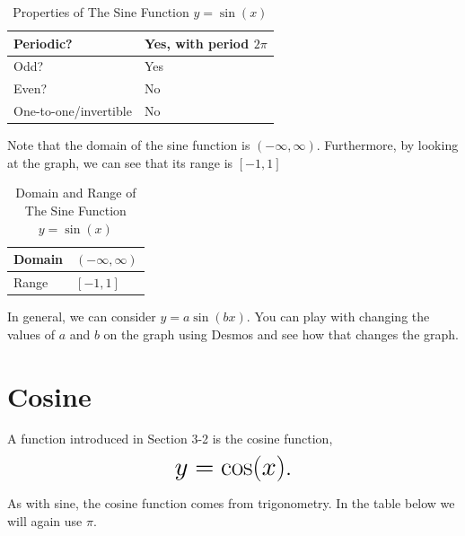 \documentclass[nooutcomes]{ximera}
\begin{document}
\begin{table}[h]
\caption{\label{tab:sineproperties}Properties of The Sine Function $y = \sin(x)$}
\centering
\begin{tabular}{l|l}
Periodic? & Yes, with period $2\pi$ \\ \hline
Odd? &  Yes \\ \hline
Even? & No \\ \hline
One-to-one/invertible & No
\end{tabular}
\end{table}

Note that the domain of the sine function is $(-\infty, \infty)$. Furthermore, by looking at the graph, we can see that its range is $[-1, 1]$

\begin{table}[h]
\caption{\label{tab:sinedr}Domain and Range of The Sine Function $y = \sin(x)$}
\centering
\begin{tabular}{l|l}
Domain & $(-\infty, \infty)$ \\ \hline
Range & $[-1, 1]$
\end{tabular}
\end{table}

In general, we can consider $y=a\sin(bx)$.  You can play with changing the values of $a$ and $b$ on the graph using Desmos and see how that changes the graph.  

\begin{center}  
\end{center}



\newpage


\section{Cosine}
A function introduced in Section 3-2 is the cosine function, $$ \mbox{\huge $y=\cos(x)$.}$$ 


As with sine, the cosine function comes from trigonometry. In the table below we will again use $\pi$.

\begin{image}
\end{image}
\end{document}
